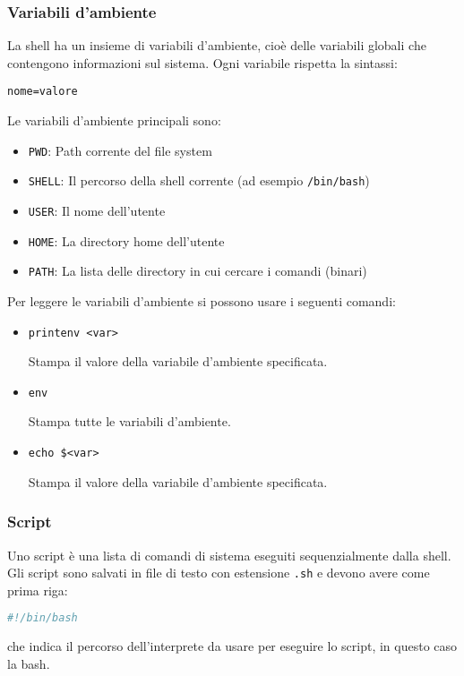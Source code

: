\documentclass[a4paper]{article}
\begin{document}
\subsubsection{Variabili d'ambiente}
La shell ha un insieme di variabili d'ambiente, cioè delle variabili globali che
contengono informazioni sul sistema.
Ogni variabile rispetta la sintassi:
\begin{lstlisting}
nome=valore
\end{lstlisting}
Le variabili d'ambiente principali sono:
\begin{itemize}
  \item \texttt{PWD}: Path corrente del file system
  \item \texttt{SHELL}: Il percorso della shell corrente (ad esempio \texttt{/bin/bash})
  \item \texttt{USER}: Il nome dell'utente
  \item \texttt{HOME}: La directory home dell'utente
  \item \texttt{PATH}: La lista delle directory in cui cercare i comandi (binari)
\end{itemize}

\vspace{1em}
\noindent
Per leggere le variabili d'ambiente si possono usare i seguenti comandi:
\begin{itemize}
\item 
\begin{lstlisting}
printenv <var>
\end{lstlisting}
Stampa il valore della variabile d'ambiente specificata.

\item 
\begin{lstlisting}
env
\end{lstlisting}
Stampa tutte le variabili d'ambiente.

\item 
\begin{lstlisting}
echo $<var>
\end{lstlisting}
Stampa il valore della variabile d'ambiente specificata.
\end{itemize}

\subsubsection{Script}
Uno script è una lista di comandi di sistema eseguiti sequenzialmente dalla shell.
Gli script sono salvati in file di testo con estensione \texttt{.sh} e devono avere
come prima riga:
\begin{lstlisting}[language=bash]
#!/bin/bash
\end{lstlisting}
che indica il percorso dell'interprete da usare per eseguire lo script, in questo caso
la bash.
\end{document}
